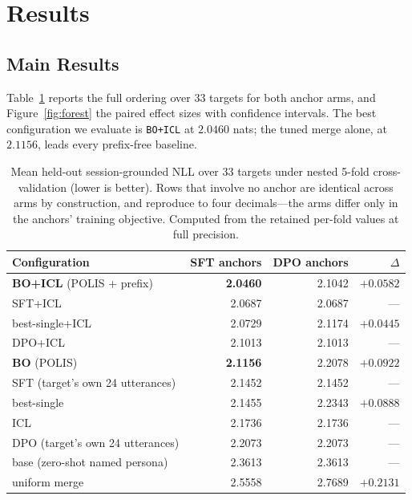 \documentclass[11pt,letterpaper]{article}
\begin{document}
\section{Results}
\subsection{Main Results}
\label{sec:main}
Table~\ref{tab:main} reports the full ordering over 33 targets for both anchor arms, and Figure~\ref{fig:forest} the paired effect sizes with confidence intervals. The best configuration we evaluate is \texttt{BO+ICL} at $2.0460$ nats; the tuned merge alone, at $2.1156$, leads every prefix-free baseline.

\begin{table}[t]
\centering
\caption{Mean held-out session-grounded NLL over 33 targets under nested 5-fold cross-validation (lower is better). Rows that involve no anchor are identical across arms by construction, and reproduce to four decimals---the arms differ only in the anchors' training objective. Computed from the retained per-fold values at full precision.}
\label{tab:main}
\begin{tabular}{lrrr}
\toprule
Configuration & SFT anchors & DPO anchors & $\Delta$ \\
\midrule
\textbf{BO+ICL} (POLIS + prefix) & \textbf{2.0460} & 2.1042 & $+0.0582$ \\
SFT+ICL                          & 2.0687 & 2.0687 & --- \\
best-single+ICL                  & 2.0729 & 2.1174 & $+0.0445$ \\
DPO+ICL                          & 2.1013 & 2.1013 & --- \\
\textbf{BO} (POLIS)              & \textbf{2.1156} & 2.2078 & $+0.0922$ \\
SFT (target's own 24 utterances) & 2.1452 & 2.1452 & --- \\
best-single                      & 2.1455 & 2.2343 & $+0.0888$ \\
ICL                              & 2.1736 & 2.1736 & --- \\
DPO (target's own 24 utterances) & 2.2073 & 2.2073 & --- \\
base (zero-shot named persona)   & 2.3613 & 2.3613 & --- \\
uniform merge                    & 2.5558 & 2.7689 & $+0.2131$ \\
\bottomrule
\end{tabular}
\end{table}
\end{document}
